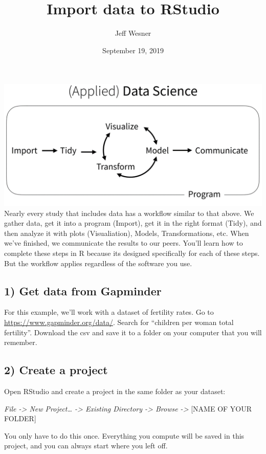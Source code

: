\documentclass[]{article}
\title{Import data to RStudio}
\author{Jeff Wesner}
\date{September 19, 2019}
\begin{document}
\maketitle

\includegraphics{data_workflow.png} Nearly every study that includes
data has a workflow similar to that above. We gather data, get it into a
program (Import), get it in the right format (Tidy), and then analyze it
with plots (Visualiation), Models, Transformations, etc. When we've
finished, we communicate the results to our peers. You'll learn how to
complete these steps in R because its designed specifically for each of
these steps. But the workflow applies regardless of the software you
use.

\subsection{1) Get data from Gapminder}\label{get-data-from-gapminder}

For this example, we'll work with a dataset of fertility rates. Go to
\url{https://www.gapminder.org/data/}. Search for ``children per woman
total fertility''. Download the csv and save it to a folder on your
computer that you will remember.

\subsection{2) Create a project}\label{create-a-project}

Open RStudio and create a project in the same folder as your dataset:

\emph{File -\textgreater{} New Project\ldots{} -\textgreater{} Existing
Directory -\textgreater{} Browse -\textgreater{}} {[}NAME OF YOUR
FOLDER{]}

You only have to do this once. Everything you compute will be saved in
this project, and you can always start where you left off.
\end{document}
